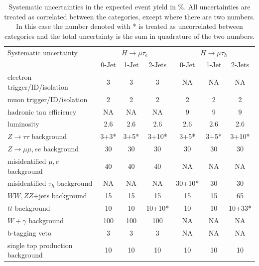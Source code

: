 \documentclass[oneside, letterpaper, oldfontcommands]{memoir}
\begin{document}
\begin{table}[t]
 \centering
  \caption{Systematic uncertainties in the expected event yield in \%. All uncertainties are treated as correlated between the categories, except where there are two numbers. In
this case the number denoted with * is treated as uncorrelated between categories and the
total uncertainty is the sum in quadrature of the two numbers.}
  \label{tab:systematics}
{
\begin{tabular}{lccc|ccc} \hline
Systematic  uncertainty                                &  \multicolumn{3}{c|}{$H \rightarrow \mu \tau_{e}$}& \multicolumn{3}{c}{$H \rightarrow \mu \tau_{h}$}    \\ \cline{2-7}
                                                       &  0-Jet  & 1-Jet  & 2-Jets     &  0-Jet    & 1-Jet     & 2-Jets     \\ \hline
electron trigger/ID/isolation                          &   3   &   3  &   3     &    NA      &   NA       &  NA        \\
muon  trigger/ID/isolation                             &   2   &   2  &   2     &    2    &  2      &  2      \\
hadronic tau efficiency                                &   NA     &   NA    &   NA       &    9    &  9      &  9      \\
luminosity                                             &  2.6  &  2.6 &  2.6    &  2.6    &  2.6    &  2.6    \\
$Z \rightarrow \tau \tau$ background                           &   3+3*&  3+5*&  3+10*  &   3+5*  &   3+5*  &   3+10* \\
$Z \rightarrow \mu\mu,ee$ background                           &   30  &  30  &  30     &   30    &   30    &   30    \\
misidentified $\mu,e$  background                      &  40   &  40  &  40     &    NA      &   NA       &   NA       \\
misidentified $\tau_{h}$  background                           &  NA      &   NA    &    NA      &   30+10*&  30     &  30     \\
$WW,ZZ$+jets background                                 &  15   &  15  &   15    &  15     &  15     &  65     \\
$t\bar{t}$ background                         &  10  &  10 &  10+10* &  10    &  10    &  10+33* \\
$W +\gamma$ background                                 &  100  &  100 &  100   &     NA     &    NA      &    NA       \\
b-tagging veto                                         &    3  &   3  &   3     &    NA      &    NA      &    NA       \\
single top production background                       &  10   &  10  &  10    &  10    &  10    &   10    \\ \hline
  \end{tabular}
}
\end{table}
\end{document}
